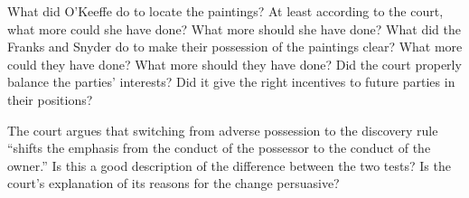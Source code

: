 
\item What did O'Keeffe do to locate the paintings? At least according to the
court, what more could she have done? What more should she have done? What did
the Franks and Snyder do to make their possession of the paintings clear? What
more could they have done? What more should they have done? Did the court
properly balance the parties' interests? Did it give the right incentives to
future parties in their positions?


\item The court argues that switching from adverse possession to the discovery
rule ``shifts the emphasis from the conduct of the possessor to the conduct of
the owner.'' Is this a good description of the difference between the two
tests? Is the court's explanation of its reasons for the change persuasive?


